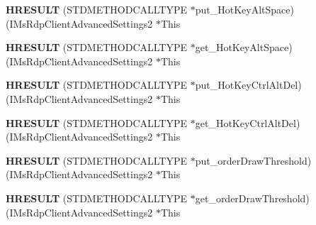 \begin{DoxyCompactItemize}
\item 
\mbox{\label{struct_i_ms_rdp_client_advanced_settings2_vtbl_ad0ae0371f3101111939477fd05a5ef48}} 
{\bfseries H\+R\+E\+S\+U\+LT} (S\+T\+D\+M\+E\+T\+H\+O\+D\+C\+A\+L\+L\+T\+Y\+PE $\ast$put\+\_\+\+Hot\+Key\+Alt\+Space)(I\+Ms\+Rdp\+Client\+Advanced\+Settings2 $\ast$This
\item 
\mbox{\label{struct_i_ms_rdp_client_advanced_settings2_vtbl_a960d9cf58fcb9688ea724f6aae0db9da}} 
{\bfseries H\+R\+E\+S\+U\+LT} (S\+T\+D\+M\+E\+T\+H\+O\+D\+C\+A\+L\+L\+T\+Y\+PE $\ast$get\+\_\+\+Hot\+Key\+Alt\+Space)(I\+Ms\+Rdp\+Client\+Advanced\+Settings2 $\ast$This
\item 
\mbox{\label{struct_i_ms_rdp_client_advanced_settings2_vtbl_ae16f14f10bb1b41cd82cff261e05a742}} 
{\bfseries H\+R\+E\+S\+U\+LT} (S\+T\+D\+M\+E\+T\+H\+O\+D\+C\+A\+L\+L\+T\+Y\+PE $\ast$put\+\_\+\+Hot\+Key\+Ctrl\+Alt\+Del)(I\+Ms\+Rdp\+Client\+Advanced\+Settings2 $\ast$This
\item 
\mbox{\label{struct_i_ms_rdp_client_advanced_settings2_vtbl_a485476780c63d48bf901f189c1fdf69e}} 
{\bfseries H\+R\+E\+S\+U\+LT} (S\+T\+D\+M\+E\+T\+H\+O\+D\+C\+A\+L\+L\+T\+Y\+PE $\ast$get\+\_\+\+Hot\+Key\+Ctrl\+Alt\+Del)(I\+Ms\+Rdp\+Client\+Advanced\+Settings2 $\ast$This
\item 
\mbox{\label{struct_i_ms_rdp_client_advanced_settings2_vtbl_a914e87630316af85cd5e36c2e3233d26}} 
{\bfseries H\+R\+E\+S\+U\+LT} (S\+T\+D\+M\+E\+T\+H\+O\+D\+C\+A\+L\+L\+T\+Y\+PE $\ast$put\+\_\+order\+Draw\+Threshold)(I\+Ms\+Rdp\+Client\+Advanced\+Settings2 $\ast$This
\item 
\mbox{\label{struct_i_ms_rdp_client_advanced_settings2_vtbl_a8cb7b09ff1f9aa66d257f14a188e89a0}} 
{\bfseries H\+R\+E\+S\+U\+LT} (S\+T\+D\+M\+E\+T\+H\+O\+D\+C\+A\+L\+L\+T\+Y\+PE $\ast$get\+\_\+order\+Draw\+Threshold)(I\+Ms\+Rdp\+Client\+Advanced\+Settings2 $\ast$This
\item 
\mbox{\label{struct_i_ms_rdp_client_advanced_settings2_vtbl_a92f202542ab6ab3ba2451a9fa5c5600e}} 

\end{DoxyCompactItemize}
